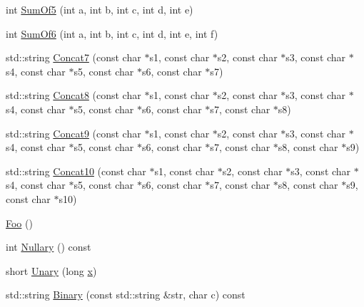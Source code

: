 \begin{DoxyCompactItemize}
\item 
int \mbox{\hyperlink{classtesting_1_1gmock__more__actions__test_1_1_foo_a55fb0cdc224c450f401e0fea4f979512}{Sum\+Of5}} (int a, int b, int c, int d, int e)
\item 
int \mbox{\hyperlink{classtesting_1_1gmock__more__actions__test_1_1_foo_a34b5ae7cd4620331af92c637e3534bc4}{Sum\+Of6}} (int a, int b, int c, int d, int e, int f)
\item 
std\+::string \mbox{\hyperlink{classtesting_1_1gmock__more__actions__test_1_1_foo_a5ff9313371e65a91b086afdc2032b0eb}{Concat7}} (const char $\ast$s1, const char $\ast$s2, const char $\ast$s3, const char $\ast$s4, const char $\ast$s5, const char $\ast$s6, const char $\ast$s7)
\item 
std\+::string \mbox{\hyperlink{classtesting_1_1gmock__more__actions__test_1_1_foo_a25b91cea8633d026fe3f4a36c1574b8e}{Concat8}} (const char $\ast$s1, const char $\ast$s2, const char $\ast$s3, const char $\ast$s4, const char $\ast$s5, const char $\ast$s6, const char $\ast$s7, const char $\ast$s8)
\item 
std\+::string \mbox{\hyperlink{classtesting_1_1gmock__more__actions__test_1_1_foo_a8f5b145b0cd23055630b2f9d10b3f45b}{Concat9}} (const char $\ast$s1, const char $\ast$s2, const char $\ast$s3, const char $\ast$s4, const char $\ast$s5, const char $\ast$s6, const char $\ast$s7, const char $\ast$s8, const char $\ast$s9)
\item 
std\+::string \mbox{\hyperlink{classtesting_1_1gmock__more__actions__test_1_1_foo_ad5b1d2dd1bcec98fdc90a05487ec3b14}{Concat10}} (const char $\ast$s1, const char $\ast$s2, const char $\ast$s3, const char $\ast$s4, const char $\ast$s5, const char $\ast$s6, const char $\ast$s7, const char $\ast$s8, const char $\ast$s9, const char $\ast$s10)
\item 
\mbox{\hyperlink{classtesting_1_1gmock__more__actions__test_1_1_foo_ad2603a65b94e019c75f4227787b9177e}{Foo}} ()
\item 
int \mbox{\hyperlink{classtesting_1_1gmock__more__actions__test_1_1_foo_ad6ba38dbb9b1594ac178630f07c4baa5}{Nullary}} () const
\item 
short \mbox{\hyperlink{classtesting_1_1gmock__more__actions__test_1_1_foo_a68d2b46d6cc7d51979b0254940af6090}{Unary}} (long \mbox{\hyperlink{_obj__test_2lib_2googletest-master_2googlemock_2test_2gmock-matchers__test_8cc_a6150e0515f7202e2fb518f7206ed97dc}{x}})
\item 
std\+::string \mbox{\hyperlink{classtesting_1_1gmock__more__actions__test_1_1_foo_a8ee56742c6c025af680617464c71ecef}{Binary}} (const std\+::string \&str, char c) const

\end{DoxyCompactItemize}
